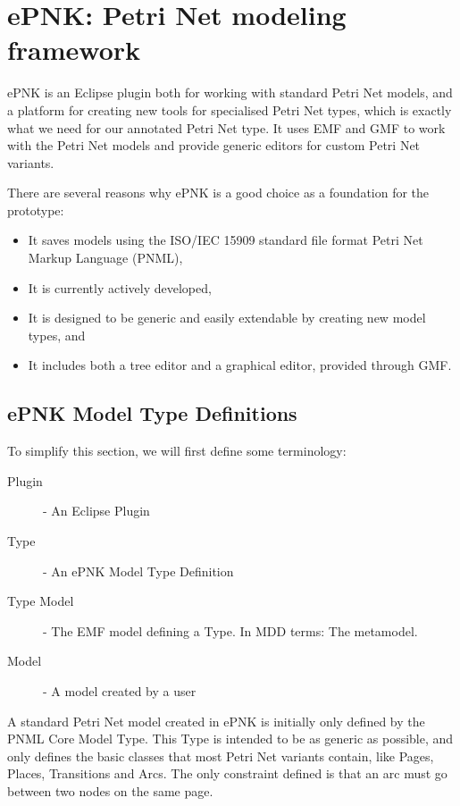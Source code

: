 \section{ePNK: Petri Net modeling framework}
\label{sec:epnk}
ePNK is an Eclipse plugin both for working with standard Petri Net models, and a
platform for creating new tools for specialised Petri Net types, which is
exactly what we need for our annotated Petri Net type. It uses EMF and GMF to
work with the Petri Net models and provide generic editors for custom Petri Net variants.

There are several reasons why ePNK is a good choice as a foundation for the
prototype:
\begin{itemize}
	\item It saves models using the ISO/IEC 15909 \cite{ISO-15909-2} standard file
	format Petri Net Markup Language (PNML),
	\item It is currently actively developed,
	\item It is designed to be generic and easily extendable by creating new model
	types, and
	\item It includes both a tree editor and a graphical editor, provided through
	GMF.
\end{itemize}

\subsection{ePNK Model Type Definitions}

To simplify this section, we will first define some terminology:
 \begin{description}
 \item[Plugin] - An Eclipse Plugin 
 \item[Type] - An ePNK Model Type Definition 
 \item[Type Model] - The EMF model defining a Type. In MDD terms: The metamodel.
 \item[Model] - A model created by a user
 \end{description}
 
A standard Petri Net model created in ePNK is initially only defined by the PNML
Core Model Type. This Type is intended to be as generic as possible, and
only defines the basic classes that most Petri Net variants contain, like Pages,
Places, Transitions and Arcs. The only constraint defined is that an arc
must go between two nodes on the same page.

